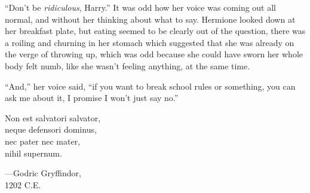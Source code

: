 “Don’t be \emph{ridiculous}, Harry.” It was odd how her voice was coming out all normal, and without her thinking about what to say. Hermione looked down at her breakfast plate, but eating seemed to be clearly out of the question, there was a roiling and churning in her stomach which suggested that she was already on the verge of throwing up, which was odd because she could have sworn her whole body felt numb, like she wasn’t feeling anything, at the same time.

“And,” her voice said, “if you want to break school rules or something, you can ask me about it, I promise I won’t just say no.”

\later

\begin{center}
Non est salvatori salvator,\\
neque defensori dominus,\\
nec pater nec mater,\\
nihil supernum.

—Godric Gryffindor,\\
1202 C.E.
\end{center}

